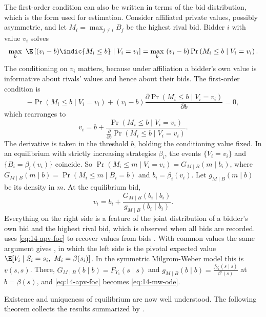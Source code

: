 The first-order condition can also be written in terms of the bid distribution, which is the form used for
estimation. Consider affiliated private values, possibly asymmetric, and let $M_i=\max_{j\ne i}B_j$ be the
highest rival bid. Bidder $i$ with value $v_i$ solves
\begin{equation*}
  \max_b\ \E\left[(v_i-b)\indic\{M_i\le b\}\mid V_i=v_i\right]=\max_b\ (v_i-b)\Pr\left(M_i\le b\mid V_i=v_i\right).
\end{equation*}
The conditioning on $v_i$ matters, because under affiliation a bidder's own value is informative about rivals'
values and hence about their bids. The first-order condition is
\begin{equation*}
  -\Pr\left(M_i\le b\mid V_i=v_i\right)+(v_i-b)\frac{\partial\Pr\left(M_i\le b\mid V_i=v_i\right)}{\partial b}=0,
\end{equation*}
which rearranges to
\begin{equation*}
  v_i=b+\frac{\Pr\left(M_i\le b\mid V_i=v_i\right)}{\frac{\partial}{\partial b}\Pr\left(M_i\le b\mid V_i=v_i\right)}.
\end{equation*}
The derivative is taken in the threshold $b$, holding the conditioning value fixed. In an equilibrium with
strictly increasing strategies $\beta_i$, the events $\{V_i=v_i\}$ and $\{B_i=\beta_i(v_i)\}$ coincide. So
$\Pr(M_i\le m\mid V_i=v_i)=G_{M\mid B}(m\mid b_i)$, where $G_{M\mid B}(m\mid b)=\Pr(M_i\le m\mid B_i=b)$ and
$b_i=\beta_i(v_i)$. Let $g_{M\mid B}(m\mid b)$ be its density in $m$. At the equilibrium bid,
\begin{equation}\label{eq:14-apv-foc}
  v_i=b_i+\frac{G_{M\mid B}(b_i\mid b_i)}{g_{M\mid B}(b_i\mid b_i)}.
\end{equation}
Everything on the right side is a feature of the joint distribution of a bidder's own bid and the highest
rival bid, which is observed when all bids are recorded.  uses \eqref{eq:14-apv-foc}
to recover values from bids \citep{LiPerrigneVuong2002,CampoPerrigneVuong2003}. With common values the same
argument gives \citet[eq.~(2.4)]{AtheyHaile2007}, in which the left side is the pivotal expected value
$\E[V_i\mid S_i=s_i,\ M_i=\beta(s_i)]$. In the symmetric Milgrom-Weber model this is $v(s,s)$. There,
$G_{M\mid B}(b\mid b)=F_{Y_1}(s\mid s)$ and $g_{M\mid B}(b\mid b)=\frac{f_{Y_1}(s\mid s)}{\beta'(s)}$ at
$b=\beta(s)$, and \eqref{eq:14-apv-foc} becomes \eqref{eq:14-mw-ode}.

Existence and uniqueness of equilibrium are now well understood. The following theorem collects the results
summarized by \citet[Theorem~2.1]{AtheyHaile2007}.

